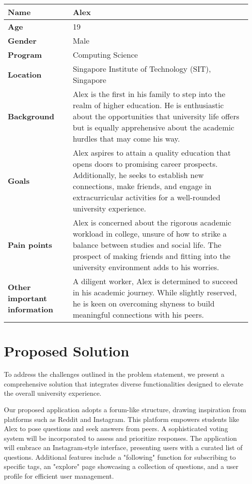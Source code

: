 \begin{center}
\begin{longtable}{|l|p{10cm}|}
\hline
\textbf{Name} & Alex \\
\hline
\textbf{Age} & 19 \\
\hline
\textbf{Gender} & Male \\
\hline
\textbf{Program} & Computing Science \\
\hline
\textbf{Location} & Singapore Institute of Technology (SIT), Singapore\\
\hline
\textbf{Background} & Alex is the first in his family to step into the realm of higher education. He is enthusiastic about the opportunities that university life offers but is equally apprehensive about the academic hurdles that may come his way. \\
\hline
\textbf{Goals} & Alex aspires to attain a quality education that opens doors to promising career prospects. Additionally, he seeks to establish new connections, make friends, and engage in extracurricular activities for a well-rounded university experience. \\
\hline
\textbf{Pain points} & Alex is concerned about the rigorous academic workload in college, unsure of how to strike a balance between studies and social life. The prospect of making friends and fitting into the university environment adds to his worries. \\
\hline
\textbf{Other important information} & A diligent worker, Alex is determined to succeed in his academic journey. While slightly reserved, he is keen on overcoming shyness to build meaningful connections with his peers. \\
\hline
\end{longtable}
\end{center}


\section{Proposed Solution}\label{proposed_solution}

To address the challenges outlined in the problem statement, we present a comprehensive solution that integrates diverse functionalities designed to elevate the overall university experience.

Our proposed application adopts a forum-like structure, drawing inspiration from platforms such as Reddit and Instagram. This platform empowers students like Alex to pose questions and seek answers from peers. A sophisticated voting system will be incorporated to assess and prioritize responses. The application will embrace an Instagram-style interface, presenting users with a curated list of questions. Additional features include a "following" function for subscribing to specific tags, an "explore" page showcasing a collection of questions, and a user profile for efficient user management.

